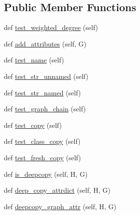 \subsection*{Public Member Functions}
\begin{DoxyCompactItemize}
\item 
def \hyperlink{classnetworkx_1_1classes_1_1tests_1_1test__graph_1_1BaseAttrGraphTester_aee7898afb174bb542b0e23f3a5d37a91}{test\+\_\+weighted\+\_\+degree} (self)
\item 
def \hyperlink{classnetworkx_1_1classes_1_1tests_1_1test__graph_1_1BaseAttrGraphTester_a6a835260db05497e3035a59c98544427}{add\+\_\+attributes} (self, G)
\item 
def \hyperlink{classnetworkx_1_1classes_1_1tests_1_1test__graph_1_1BaseAttrGraphTester_a47f80c847ec0051c830e7566a141df92}{test\+\_\+name} (self)
\item 
def \hyperlink{classnetworkx_1_1classes_1_1tests_1_1test__graph_1_1BaseAttrGraphTester_af1ae15bdbc31dfd76fb02a5588f5c557}{test\+\_\+str\+\_\+unnamed} (self)
\item 
def \hyperlink{classnetworkx_1_1classes_1_1tests_1_1test__graph_1_1BaseAttrGraphTester_afb435464de85bfd29a49670cc6c81dc3}{test\+\_\+str\+\_\+named} (self)
\item 
def \hyperlink{classnetworkx_1_1classes_1_1tests_1_1test__graph_1_1BaseAttrGraphTester_afecc0b8facc99b744070847c39d599a2}{test\+\_\+graph\+\_\+chain} (self)
\item 
def \hyperlink{classnetworkx_1_1classes_1_1tests_1_1test__graph_1_1BaseAttrGraphTester_a7abc2f3fb31c2d036b20d0ff751ec713}{test\+\_\+copy} (self)
\item 
def \hyperlink{classnetworkx_1_1classes_1_1tests_1_1test__graph_1_1BaseAttrGraphTester_a0ce764db95360e008fe54f3d3519bede}{test\+\_\+class\+\_\+copy} (self)
\item 
def \hyperlink{classnetworkx_1_1classes_1_1tests_1_1test__graph_1_1BaseAttrGraphTester_ab70d0d4fcfd921c7aca748433cbbf25b}{test\+\_\+fresh\+\_\+copy} (self)
\item 
def \hyperlink{classnetworkx_1_1classes_1_1tests_1_1test__graph_1_1BaseAttrGraphTester_abe71a9d4a1a647da1cc4c2e06a831d29}{is\+\_\+deepcopy} (self, H, G)
\item 
def \hyperlink{classnetworkx_1_1classes_1_1tests_1_1test__graph_1_1BaseAttrGraphTester_a8993bfff230376ad7e5470c52454679d}{deep\+\_\+copy\+\_\+attrdict} (self, H, G)
\item 
def \hyperlink{classnetworkx_1_1classes_1_1tests_1_1test__graph_1_1BaseAttrGraphTester_afb3ca7107fca33a1625f341adc67a0cc}{deepcopy\+\_\+graph\+\_\+attr} (self, H, G)

\end{DoxyCompactItemize}
